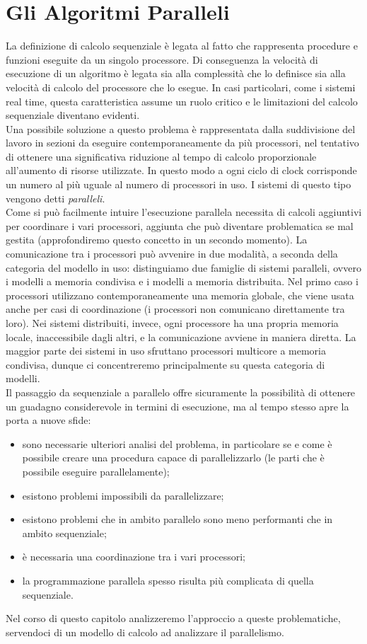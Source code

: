 \chapter{Gli Algoritmi Paralleli}
La definizione di calcolo sequenziale è legata al fatto che rappresenta procedure e funzioni eseguite da un singolo processore. Di conseguenza la velocità di esecuzione di un algoritmo è legata sia alla complessità che lo definisce sia alla velocità di calcolo del processore che lo esegue. In casi particolari, come i sistemi real time, questa caratteristica assume un ruolo critico e le limitazioni del calcolo sequenziale diventano evidenti.\\
Una possibile soluzione a questo problema è rappresentata dalla suddivisione del lavoro in sezioni da eseguire contemporaneamente da più processori, nel tentativo di ottenere una significativa riduzione al tempo di calcolo proporzionale all'aumento di risorse utilizzate. In questo modo a ogni ciclo di clock corrisponde un numero al più uguale al numero di processori in uso. I sistemi di questo tipo vengono detti \textit{paralleli}.\\
Come si può facilmente intuire l'esecuzione parallela necessita di calcoli aggiuntivi per coordinare i vari processori, aggiunta che può diventare problematica se mal gestita (approfondiremo questo concetto in un secondo momento). La comunicazione tra i processori può avvenire in due modalità, a seconda della categoria del modello in uso: distinguiamo due famiglie di sistemi paralleli, ovvero i modelli a memoria condivisa e i modelli a memoria distribuita. Nel primo caso i processori utilizzano contemporaneamente una memoria globale, che viene usata anche per casi di coordinazione (i processori non comunicano direttamente tra loro). Nei sistemi distribuiti, invece, ogni processore ha una propria memoria locale, inaccessibile dagli altri, e la comunicazione avviene in maniera diretta. La maggior parte dei sistemi in uso sfruttano processori multicore a memoria condivisa, dunque ci concentreremo principalmente su questa categoria di modelli.\\
\newpage
\noindent Il passaggio da sequenziale a parallelo offre sicuramente la possibilità di ottenere un guadagno considerevole in termini di esecuzione, ma al tempo stesso apre la porta a nuove sfide: 
\begin{itemize}
\item{sono necessarie ulteriori analisi del problema, in particolare se e come è possibile creare una procedura capace di parallelizzarlo (le parti che è possibile eseguire parallelamente);}
\item{esistono problemi impossibili da parallelizzare;}
\item{esistono problemi che in ambito parallelo sono meno performanti che in ambito sequenziale;}
\item{è necessaria una coordinazione tra i vari processori;}
\item{la programmazione parallela spesso risulta più complicata di quella sequenziale.}
\end{itemize}
Nel corso di questo capitolo analizzeremo l'approccio a queste problematiche, servendoci di un modello di calcolo ad analizzare il parallelismo.
